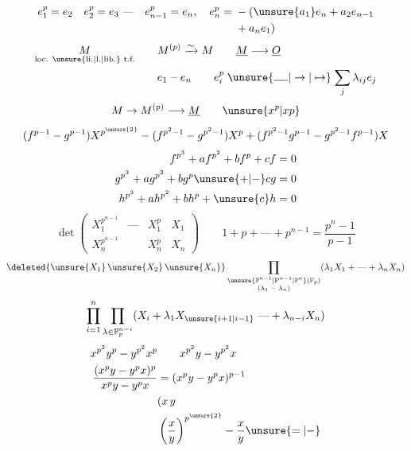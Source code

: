\[
 \begin{aligned}
 e_1^p=e_2\quad e_2^p=e_3\ \text{---}\quad e_{n-1}^{p}=e_n,\quad
 e_n^p={}&-(\unsure{a_1}e_n+a_2e_{n-1}\\
 &{}+a_ne_1)
 \end{aligned}
\]
\[
 \begin{aligned}
 \underset{\text{loc. \unsure{li.|l.|lib.} t.f.}}M\qquad&M^{(p)}\xrightarrow{\sim}M
   \qquad\underline M\longrightarrow\underline O\\
 &e_1\ \text{--}\ e_n\qquad e_i^p\mathrel{\unsure{\rule{1.3em}{.4pt}|\to|\mapsto}}\sum_j\lambda_{ij}e_j
 \end{aligned}
\]
\[
 M\to M^{(p)}\longrightarrow\underline M\qquad \unsure{x^p|xp}
\]
\[
 (f^{p-1}-g^{p-1})X^{p^{\unsure{2}}}-
 (f^{p^2-1}-g^{p^2-1})X^p+
 (f^{p^2-1}g^{p-1}-g^{p^2-1}f^{p-1})X
\]
\[
 \begin{aligned}
 f^{p^3}+a f^{p^2}+b f^p+c f&=0\\
 g^{p^3}+a g^{p^2}+b g^p\unsure{+|-}c g&=0\\
 h^{p^3}+a h^{p^2}+b h^p+\unsure{c}h&=0
 \end{aligned}
\]
\[
 \det\begin{pmatrix}
 X_1^{p^{n-1}}&\text{---}&X_1^p&X_1\\[1.6ex]
 X_n^{p^{n-1}}&&X_n^p&X_n
 \end{pmatrix}
 \qquad 1+p+\text{---}+p^{n-1}=\frac{p^n-1}{p-1}
\]
\[
 \deleted{\unsure{X_1}\,\unsure{X_2}\,\unsure{X_n}}
 \prod_{\substack{\unsure{\mathbb P^{n-1}|\mathrm P^{n-1}|\mathbb P^n}(\mathbb F_p)\\
 (\lambda_1\ \text{--}\ \lambda_n)}}(\lambda_1X_1+\text{---}+\lambda_nX_n)
\]
\[
 \prod_{i=1}^{n}\prod_{\lambda\in\mathbb F_p^{n-i}}
 (X_i+\lambda_1 X_{\unsure{i+1|i-1}}\ \text{---}+\lambda_{n-i}X_n)
\]
\[
 \begin{aligned}
 x^{p^2}y^p-y^{p^2}x^p&\qquad x^{p^2}y-y^{p^2}x\\
 \frac{(x^p y-y^p x)^p}{x^p y-y^p x}&=(x^p y-y^p x)^{p-1}\\
 & (x\,y\\
 &\left(\frac{x}{y}\right)^{p^{\unsure{2}}}-\frac{x}{y}\unsure{=|-}
 \end{aligned}
\]
